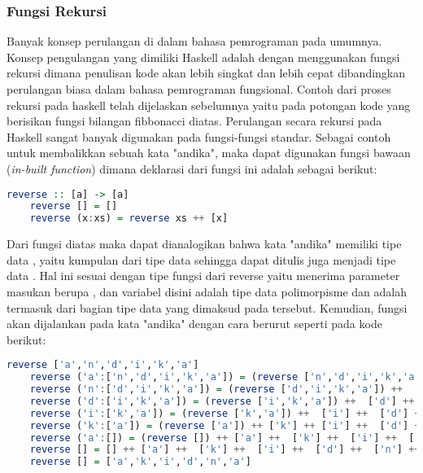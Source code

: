 \documentclass[pi.tex]{subfile}
\begin{document}
\subsubsection{Fungsi Rekursi}
  
Banyak konsep perulangan di dalam bahasa pemrograman pada umumnya. Konsep pengulangan yang dimiliki Haskell adalah dengan menggunakan fungsi rekursi dimana penulisan kode akan lebih singkat dan lebih cepat dibandingkan perulangan biasa dalam bahasa pemrograman fungsional. Contoh dari proses rekursi pada haskell telah dijelaskan sebelumnya yaitu pada potongan kode yang berisikan fungsi bilangan fibbonacci diatas. Perulangan secara rekursi pada Haskell sangat banyak digunakan pada fungsi-fungsi standar. Sebagai contoh untuk membalikkan sebuah kata "andika", maka dapat digunakan fungsi bawaan (\emph{in-built function})  dimana deklarasi dari fungsi ini adalah sebagai berikut:\\

  \begin{lstlisting}[language=Haskell]
    reverse :: [a] -> [a]  
    reverse [] = []  
    reverse (x:xs) = reverse xs ++ [x] 
  \end{lstlisting}

  Dari fungsi diatas maka dapat dianalogikan bahwa kata "andika" memiliki tipe data , yaitu kumpulan dari tipe data  sehingga dapat ditulis juga menjadi tipe data \fhaskell{[Char]}. Hal ini sesuai dengan tipe fungsi dari reverse yaitu menerima parameter masukan berupa \fhaskell{[a]}, dan variabel  disini adalah tipe data polimorpisme dan  adalah termasuk dari bagian tipe data yang dimaksud pada  tersebut. Kemudian, fungsi  akan dijalankan pada kata "andika" dengan cara berurut seperti pada kode berikut:\\

  \begin{lstlisting}[language=Haskell]
    reverse ['a','n','d','i','k','a']
    reverse ('a':['n','d','i','k','a']) = (reverse ['n','d','i','k','a']) ++ ['a']
    reverse ('n':['d','i','k','a']) = (reverse ['d','i','k','a']) ++  ['n'] ++  ['a']
    reverse ('d':['i','k','a']) = (reverse ['i','k','a']) ++  ['d'] ++  ['n'] ++  ['a']
    reverse ('i':['k','a']) = (reverse ['k','a']) ++  ['i'] ++  ['d'] ++  ['n'] ++  ['a']
    reverse ('k':['a']) = (reverse ['a']) ++ ['k'] ++ ['i'] ++  ['d'] ++  ['n'] ++ ['a']
    reverse ('a':[]) = (reverse []) ++ ['a'] ++  ['k'] ++  ['i'] ++  ['d'] ++  ['n'] ++  ['a']
    reverse [] = [] ++ ['a'] ++  ['k'] ++  ['i'] ++  ['d'] ++  ['n'] ++  ['a']
    reverse [] = ['a','k','i','d','n','a']
  \end{lstlisting}
\end{document}
